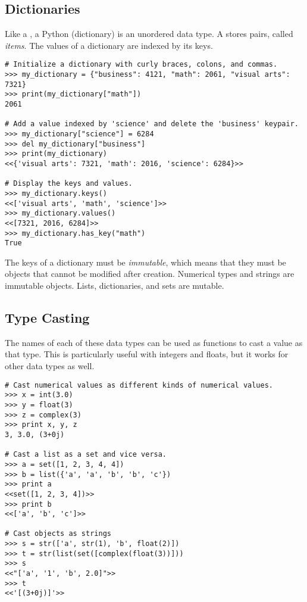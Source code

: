 
\subsection*{Dictionaries}
Like a , a Python  (dictionary) is an unordered data type.
A  stores  pairs, called \emph{items}.
The values of a dictionary are indexed by its keys.
\begin{lstlisting}
# Initialize a dictionary with curly braces, colons, and commas.
>>> my_dictionary = {"business": 4121, "math": 2061, "visual arts": 7321} 
>>> print(my_dictionary["math"])
2061

# Add a value indexed by 'science' and delete the 'business' keypair.
>>> my_dictionary["science"] = 6284
>>> del my_dictionary["business"]
>>> print(my_dictionary)
<<{'visual arts': 7321, 'math': 2016, 'science': 6284}>>

# Display the keys and values.
>>> my_dictionary.keys()
<<['visual arts', 'math', 'science']>>
>>> my_dictionary.values()
<<[7321, 2016, 6284]>>
>>> my_dictionary.has_key("math")
True
\end{lstlisting}

The keys of a dictionary must be \emph{immutable}, which means that they must be objects that cannot be modified after creation. Numerical types and strings are immutable objects. Lists, dictionaries, and sets are mutable.

\subsection*{Type Casting}

The names of each of these data types can be used as functions to cast a value as that type.
This is particularly useful with integers and floats, but it works for other data types as well.
\begin{lstlisting}
# Cast numerical values as different kinds of numerical values.
>>> x = int(3.0)
>>> y = float(3)
>>> z = complex(3)
>>> print x, y, z
3, 3.0, (3+0j)

# Cast a list as a set and vice versa.
>>> a = set([1, 2, 3, 4, 4])
>>> b = list({'a', 'a', 'b', 'b', 'c'})
>>> print a
<<set([1, 2, 3, 4])>>
>>> print b
<<['a', 'b', 'c']>>

# Cast objects as strings
>>> s = str(['a', str(1), 'b', float(2)])
>>> t = str(list(set([complex(float(3))]))
>>> s
<<"['a', '1', 'b', 2.0]">>
>>> t
<<'[(3+0j)]'>>

\end{lstlisting}

